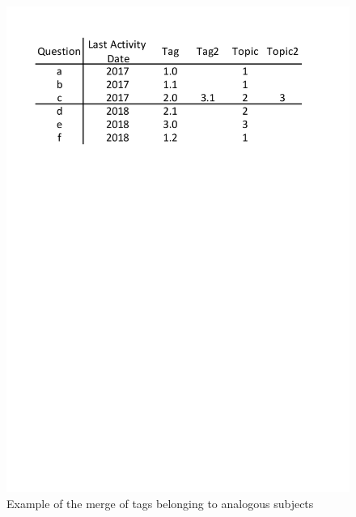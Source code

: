 \documentclass[conference]{IEEEtran}
\begin{document}
\begin{figure}[t]
 \centering
 \includegraphics[width=.9\hsize]{img/example001.pdf}  
 \caption{Example of the merge of tags belonging to analogous subjects} 
 \label{fig:example3} 
\end{figure}
\smallskip
\end{document}
